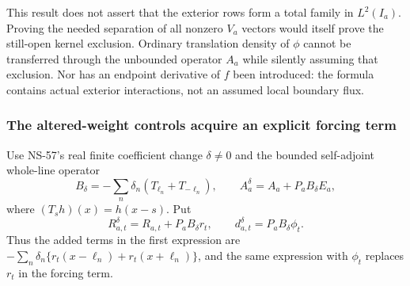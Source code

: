 \documentclass[11pt]{article}
\theoremstyle{remark}
\begin{document}
This result does not assert that the exterior rows form a total family
in $L^2(I_a)$. Proving the needed separation of all nonzero $V_a$
vectors would itself prove the still-open kernel exclusion. Ordinary
translation density of $\phi$ cannot be transferred through the
unbounded operator $A_a$ while silently assuming that exclusion.
Nor has an endpoint derivative of $f$ been introduced: the formula
contains actual exterior interactions, not an assumed local boundary flux.

\subsubsection{The altered-weight controls acquire an explicit forcing term}

Use NS-57's real finite coefficient change $\delta\ne0$ and the
bounded self-adjoint whole-line operator
\[
 B_\delta=-\sum_n\delta_n(T_{\ell_n}+T_{-\ell_n}),\qquad
 A_a^\delta=A_a+P_a B_\delta E_a,
\]
where $(T_s h)(x)=h(x-s)$. Put
\[
 R_{a,t}^\delta=R_{a,t}+P_aB_\delta r_t,
 \qquad d_{a,t}^\delta=P_aB_\delta\phi_t.
\]
Thus the added terms in the first expression are
$-\sum_n\delta_n\{r_t(x-\ell_n)+r_t(x+\ell_n)\}$, and the
same expression with $\phi_t$ replaces $r_t$ in the forcing term.
\end{document}
